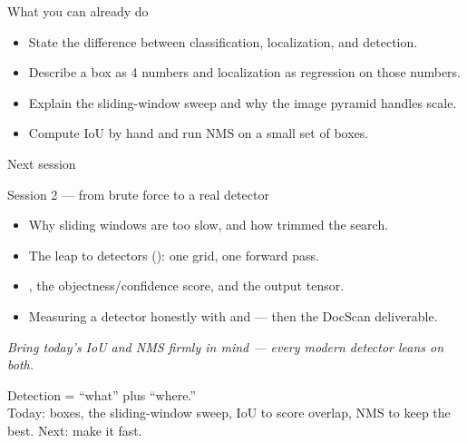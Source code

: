 \documentclass[10pt,aspectratio=169]{beamer}
\begin{document}
\begin{frame}{What you can already do}
  \begin{itemize}
    \item State the difference between classification, localization, and detection.
    \item Describe a box as 4 numbers and localization as regression on those numbers.
    \item Explain the sliding-window sweep and why the image pyramid handles scale.
    \item Compute IoU by hand and run NMS on a small set of boxes.
  \end{itemize}
\end{frame}

\begin{frame}{Next session}
  \begin{alertblock}{Session 2 --- from brute force to a real detector}
    \begin{itemize}
      \item Why sliding windows are too slow, and how  trimmed the search.
      \item The leap to  detectors (): one grid, one forward pass.
      \item {}, the objectness/confidence score, and the output tensor.
      \item Measuring a detector honestly with  and  --- then the DocScan deliverable.
    \end{itemize}
  \end{alertblock}
  \emph{Bring today's IoU and NMS firmly in mind --- every modern detector leans on both.}
\end{frame}

\begin{frame}[standout]
  Detection = ``what'' plus ``where.''\\[4pt]
  \normalsize Today: boxes, the sliding-window sweep, IoU to score overlap, NMS to keep the best. Next: make it fast.
\end{frame}
\end{document}
